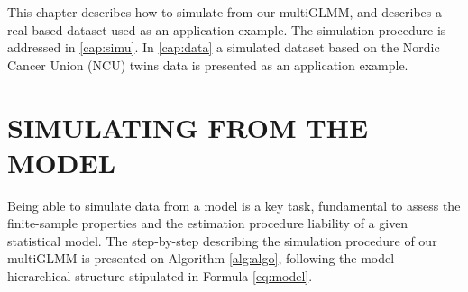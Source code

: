 This chapter describes how to simulate from our multiGLMM, and describes
a real-based dataset used as an application example. The simulation
procedure is addressed in \autoref{cap:simu}. In \autoref{cap:data} a
simulated dataset based on the Nordic Cancer Union (NCU) twins data is
presented as an application example.

\section{SIMULATING FROM THE MODEL}
\label{cap:simu}

Being able to simulate data from a model is a key task, fundamental to
assess the finite-sample properties and the estimation procedure
liability of a given statistical model. The step-by-step describing the
simulation procedure of our multiGLMM is presented on Algorithm
\autoref{alg:algo}, following the model hierarchical structure
stipulated in Formula \autoref{eq:model}.

